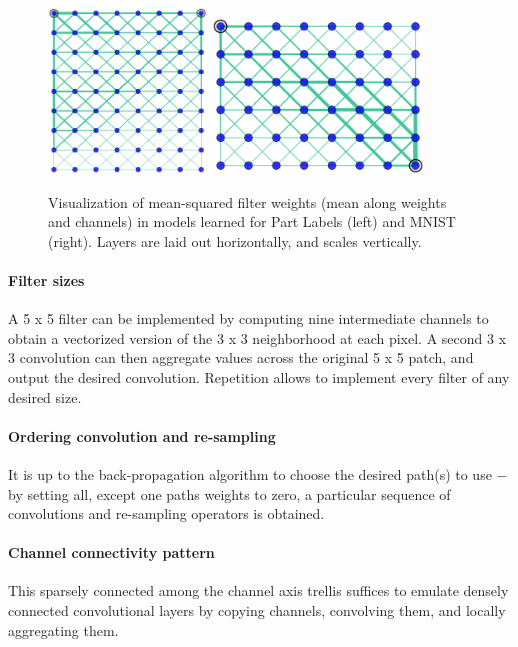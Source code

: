 \documentclass[a4paper,twocolumn]{article}
\begin{document}
\begin{figure}[t]
    \centering
    \includegraphics[width=0.375\textwidth]{fabrics2.png}
    \hskip 1cm 
    \includegraphics[width=0.5\textwidth]{fabrics3.png}
    \caption{Visualization of mean-squared filter weights (mean along weights and channels) in models learned for Part Labels (left) and MNIST (right). Layers are laid out horizontally, and scales vertically.}
\end{figure}

\paragraph{Filter sizes}
A 5 x 5 filter can be implemented by computing nine intermediate channels to obtain a vectorized version of the 3 x 3 neighborhood at each pixel. A second 3 x 3 convolution can then aggregate values across the original 5 x 5 patch, and output the desired convolution. Repetition allows to implement every filter of any desired size.

\paragraph{Ordering convolution and re-sampling}
It is up to the back-propagation algorithm to choose the desired path(s) to use $-$ by setting all, except one paths weights to zero, a particular sequence of convolutions and re-sampling operators is obtained.

\paragraph{Channel connectivity pattern}
This sparsely connected among the channel axis trellis suffices to emulate densely connected convolutional layers by copying channels, convolving them, and locally aggregating them.
\end{document}
